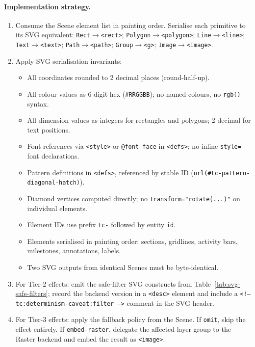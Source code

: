 \paragraph{Implementation strategy.}
\begin{enumerate}
  \item Consume the Scene element list in painting order. Serialise each primitive to its
        SVG equivalent:
        \texttt{Rect}$\to$\texttt{<rect>};
        \texttt{Polygon}$\to$\texttt{<polygon>};
        \texttt{Line}$\to$\texttt{<line>};
        \texttt{Text}$\to$\texttt{<text>};
        \texttt{Path}$\to$\texttt{<path>};
        \texttt{Group}$\to$\texttt{<g>};
        \texttt{Image}$\to$\texttt{<image>}.
  \item Apply SVG serialisation invariants:
        \begin{itemize}
          \item All coordinates rounded to 2 decimal places (round-half-up).
          \item All colour values as 6-digit hex (\texttt{\#RRGGBB}); no named colours,
                no \texttt{rgb()} syntax.
          \item All dimension values as integers for rectangles and polygons; 2-decimal
                for text positions.
          \item Font references via \texttt{<style>} or \texttt{@font-face} in
                \texttt{<defs>}; no inline \texttt{style=} font declarations.
          \item Pattern definitions in \texttt{<defs>}, referenced by stable ID
                (\texttt{url(\#tc-pattern-diagonal-hatch)}).
          \item Diamond vertices computed directly; no
                \texttt{transform="rotate(...)"} on individual elements.
          \item Element IDs use prefix \texttt{tc-} followed by entity \texttt{id}.
          \item Elements serialised in painting order: sections, gridlines, activity bars,
                milestones, annotations, labels.
          \item Two SVG outputs from identical Scenes must be byte-identical.
        \end{itemize}
  \item For Tier-2 effects: emit the safe-filter SVG constructs from
        Table~\ref{tab:svg-safe-filters}; record the backend version in a
        \texttt{<desc>} element and include a
        \texttt{<!-- tc:determinism-caveat:filter -->} comment in the SVG header.
  \item For Tier-3 effects: apply the fallback policy from the Scene. If
        \texttt{omit}, skip the effect entirely. If \texttt{embed-raster}, delegate the
        affected layer group to the Raster backend and embed the result as
        \texttt{<image>}.
\end{enumerate}

